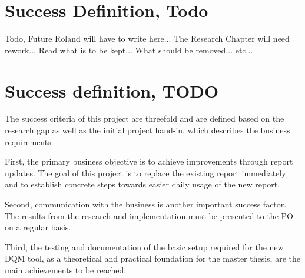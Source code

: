 
\section{Success Definition, Todo}

Todo, Future Roland will have to write here...
The Research Chapter will need rework...
Read what is to be kept...
What should be removed...
etc...


\section{Success definition, TODO}
\label{ResearchSuccessDefinition}

The success criteria of this project are threefold and are defined based on the research gap as well as the initial project hand-in, which describes the business requirements.

First, the primary business objective is to achieve improvements through report updates. The goal of this project is to replace the existing report immediately and to establish concrete steps towards easier daily usage of the new report.

Second, communication with the business is another important success factor. The results from the research and implementation must be presented to the \gls{PO} on a regular basis.

Third, the testing and documentation of the basic setup required for the new DQM tool, as a theoretical and practical foundation for the master thesis, are the main achievements to be reached.

